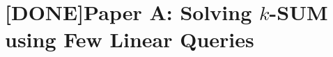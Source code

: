 \chapter{[DONE]Paper A: Solving $k$-SUM using Few Linear Queries}
\label{chapter:ksum-algorithm}





